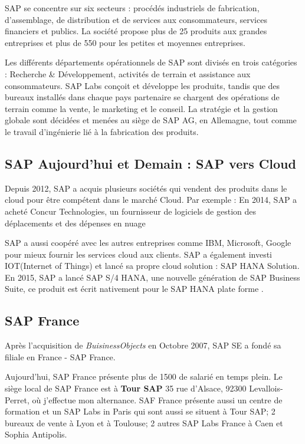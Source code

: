 SAP se concentre sur six secteurs : procédés industriels de fabrication, d’assemblage, de distribution et de services aux consommateurs, services financiers et publics. La société propose plus de 25 produits aux grandes entreprises et plus de 550 pour les petites et moyennes entreprises.

Les différents départements opérationnels de SAP sont divisés en trois catégories : Recherche \& Développement, activités de terrain et assistance aux consommateurs. SAP Labs conçoit et développe les produits, tandis que des bureaux installés dans chaque pays partenaire se chargent des opérations de terrain comme la vente, le marketing et le conseil. La stratégie et la gestion globale sont décidées et menées au siège de SAP AG, en Allemagne, tout comme le travail d’ingénierie lié à la fabrication des produits.

\subsection{SAP Aujourd'hui et Demain : SAP vers Cloud}
Depuis 2012, SAP a acquis plusieurs sociétés qui vendent des produits dans le cloud pour être compétent dans le marché Cloud. Par exemple : En 2014, SAP a acheté Concur Technologies, un fournisseur de logiciels de gestion des déplacements et des dépenses en nuage

\par SAP a aussi coopéré avec les autres entreprises comme IBM, Microsoft, Google pour mieux fournir les services cloud aux clients. SAP a également investi IOT(Internet of Things) et lancé sa propre cloud solution : SAP HANA Solution. En 2015, SAP a lancé SAP S/4 HANA, une nouvelle génération de SAP Business Suite, ce produit est écrit nativement pour le SAP HANA plate forme .

\subsection{SAP France}
    Après l'acquisition de \textit{BuisinessObjects} en Octobre 2007, SAP SE a fondé sa filiale en France - SAP France. 
    \par Aujourd'hui, SAP France présente plus de 1500 de salarié en temps plein. Le siège local de SAP France est à \textbf{Tour SAP} 35 rue d'Alsace, 92300 Levallois-Perret, où j'effectue mon alternance. SAF France présente aussi un centre de formation et un SAP Labs in Paris qui sont aussi se situent à Tour SAP; 2 bureaux de vente à Lyon et à Toulouse; 2 autres SAP Labs France à Caen et Sophia Antipolis.
    
